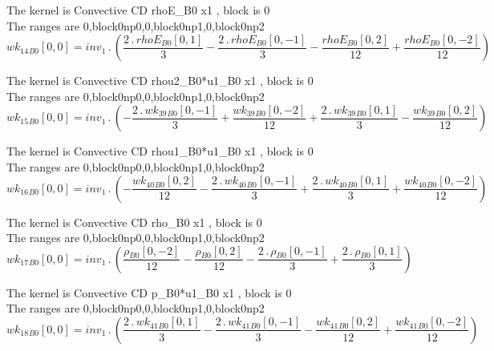 \documentclass{article}
\begin{document}
\noindent The kernel is Convective CD rhoE_B0 x1 , block is 0\\\noindent The ranges are 0,block0np0,0,block0np1,0,block0np2\\\begin{dmath}{wk_{14}{_{B0}}}[{0,0}] = inv_1 \,.\, \left(\frac{2 \,.\, {rhoE{_{B0}}}[{0,1}]}{3} - \frac{2 \,.\, {rhoE{_{B0}}}[{0,-1}]}{3} - \frac{{rhoE{_{B0}}}[{0,2}]}{12} + \frac{{rhoE{_{B0}}}[{0,-2}]}{12}\right)\end{dmath}

\noindent The kernel is Convective CD rhou2_B0*u1_B0 x1 , block is 0\\\noindent The ranges are 0,block0np0,0,block0np1,0,block0np2\\\begin{dmath}{wk_{15}{_{B0}}}[{0,0}] = inv_1 \,.\, \left(- \frac{2 \,.\, {wk_{39}{_{B0}}}[{0,-1}]}{3} + \frac{{wk_{39}{_{B0}}}[{0,-2}]}{12} + \frac{2 \,.\, {wk_{39}{_{B0}}}[{0,1}]}{3} - \frac{{wk_{39}{_{B0}}}[{0,2}]}{12}\right)\end{dmath}

\noindent The kernel is Convective CD rhou1_B0*u1_B0 x1 , block is 0\\\noindent The ranges are 0,block0np0,0,block0np1,0,block0np2\\\begin{dmath}{wk_{16}{_{B0}}}[{0,0}] = inv_1 \,.\, \left(- \frac{{wk_{40}{_{B0}}}[{0,2}]}{12} - \frac{2 \,.\, {wk_{40}{_{B0}}}[{0,-1}]}{3} + \frac{2 \,.\, {wk_{40}{_{B0}}}[{0,1}]}{3} + \frac{{wk_{40}{_{B0}}}[{0,-2}]}{12}\right)\end{dmath}

\noindent The kernel is Convective CD rho_B0 x1 , block is 0\\\noindent The ranges are 0,block0np0,0,block0np1,0,block0np2\\\begin{dmath}{wk_{17}{_{B0}}}[{0,0}] = inv_1 \,.\, \left(\frac{{\rho{_{B0}}}[{0,-2}]}{12} - \frac{{\rho{_{B0}}}[{0,2}]}{12} - \frac{2 \,.\, {\rho{_{B0}}}[{0,-1}]}{3} + \frac{2 \,.\, {\rho{_{B0}}}[{0,1}]}{3}\right)\end{dmath}

\noindent The kernel is Convective CD p_B0*u1_B0 x1 , block is 0\\\noindent The ranges are 0,block0np0,0,block0np1,0,block0np2\\\begin{dmath}{wk_{18}{_{B0}}}[{0,0}] = inv_1 \,.\, \left(\frac{2 \,.\, {wk_{41}{_{B0}}}[{0,1}]}{3} - \frac{2 \,.\, {wk_{41}{_{B0}}}[{0,-1}]}{3} - \frac{{wk_{41}{_{B0}}}[{0,2}]}{12} + \frac{{wk_{41}{_{B0}}}[{0,-2}]}{12}\right)\end{dmath}
\end{document}
